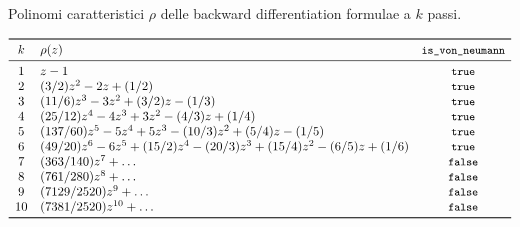 

\begin{table}[p]
\caption{Polinomi caratteristici $\rho$ delle backward
differentiation formulae a $k$ passi.}
\label{tab:lmf-BDF-coefficients}
\vspace*{-2.5ex}
\begin{equation*}
\begin{array}{clc}
\toprule
k & \rho(z) & \text{\code{is\_von\_neumann}} \\
\midrule
1 & z-1 & \text{\code{true}} \\
2 & (3/2)z^2-2z+(1/2) & \text{\code{true}} \\
3 & (11/6)z^3-3z^2+(3/2)z-(1/3) & \text{\code{true}} \\
4 & (25/12)z^4-4z^3+3z^2-(4/3)z+(1/4) & \text{\code{true}} \\
5 & (137/60)z^5-5z^4+5z^3-(10/3)z^2+(5/4)z-(1/5) & \text{\code{true}} \\
6 & (49/20)z^6-6z^5+(15/2)z^4-(20/3)z^3+(15/4)z^2-(6/5)z+(1/6) & \text{\code{true}} \\
7 & (363/140)z^7 + \dots & \text{\code{false}} \\
8 & (761/280)z^8 + \dots & \text{\code{false}} \\
9 & (7129/2520)z^9 + \dots & \text{\code{false}} \\
10 & (7381/2520)z^{10} + \dots & \text{\code{false}} \\
\bottomrule
\end{array}
\end{equation*}
\end{table}

